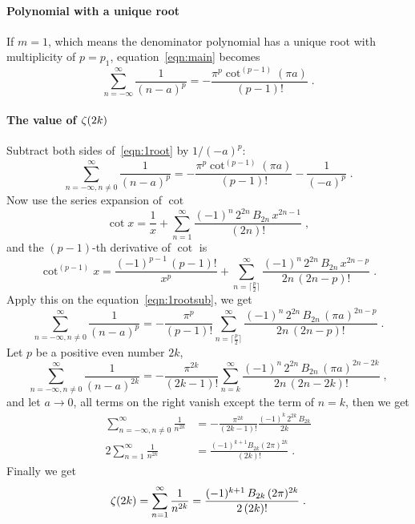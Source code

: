 \documentclass[10pt,a4paper]{article}
\begin{document}
	\paragraph{Polynomial with a unique root\\}
	If $m=1$, which means the denominator polynomial has a unique root with multiplicity of $p=p_1$, equation~\eqref{eqn:main} becomes
	\begin{equation}
	\sum_{n=-\infty}^{\infty}\frac{1}{(n-a)^p}
	=-\frac{\pi^{p}\cot^{(p-1)}(\pi a)}{(p-1)!} \; .
	\label{eqn:1root}
	\end{equation}
	\paragraph{The value of $\operatorname{\zeta}(2k)$\\}
	Subtract both sides of~\eqref{eqn:1root} by $1/(-a)^p$:
	\begin{equation}
	\sum_{n=-\infty,n\neq 0}^{\infty}\frac{1}{(n-a)^p}
	=-\frac{\pi^{p}\cot^{(p-1)}(\pi a)}{(p-1)!}-\frac{1}{(-a)^p} \; .
	\label{eqn:1rootsub}
	\end{equation}
	Now use the series expansion of $\cot$
	\[
	\cot x =\frac{1}{x} +\sum_{n=1}^{\infty}\frac{(-1)^n \, 2^{2n} \, B_{2n} \,x^{2n-1}}{(2n)!} \; ,
	\]	
	and the $(p-1)$-th derivative of $\cot$ is
	\[
	\cot^{(p-1)} x =\frac{(-1)^{p-1}\,(p-1)!}{x^p} +\sum_{n=\lceil \frac{p}{2} \rceil}^{\infty}\frac{(-1)^n \, 2^{2n} \, B_{2n} \,x^{2n-p}}{2n\,(2n-p)!} \; .
	\]
	Apply this on the equation~\eqref{eqn:1rootsub}, we get
	\[
	\sum_{n=-\infty,n\neq 0}^{\infty}\frac{1}{(n-a)^p}
	=-\frac{\pi^p}{(p-1)!}\sum_{n=\lceil \frac{p}{2} \rceil}^{\infty}\frac{(-1)^n \, 2^{2n} \, B_{2n} \,(\pi a)^{2n-p}}{2n\,(2n-p)!} \; .
	\]
	Let $p$ be a positive even number $2k$,
	\[
	\sum_{n=-\infty,n\neq 0}^{\infty}\frac{1}{(n-a)^{2k}}
	=-\frac{\pi^{2k}}{(2k-1)!}\sum_{n=k}^{\infty}\frac{(-1)^n \, 2^{2n} \, B_{2n} \,(\pi a)^{2n-2k}}{2n\,(2n-2k)!} \; ,
	\]
	and let $a \to 0$, all terms on the right vanish except the term of $n=k$, then we get
	\begin{align*}
	\sum_{n=-\infty,n\neq 0}^{\infty}\frac{1}{n^{2k}}
	&= -\frac{\pi^{2k}}{(2k-1)!}\frac{(-1)^k \, 2^{2k} \, B_{2k}}{2k} \\
	2\sum_{n=1}^{\infty}\frac{1}{n^{2k}}&= \frac{(-1)^{k+1} B_{2k}(2\pi)^{2k}}{(2k)!} \;.
	\end{align*}
	Finally we get
	\[
	\operatorname{\zeta} (2k)=\sum_{n=1}^{\infty}\frac{1}{n^{2k}}= \frac{(-1)^{k+1}\, B_{2k}\,(2\pi)^{2k}}{2\,(2k)!} \;.
	\]
	
	
	
	
\end{document}
